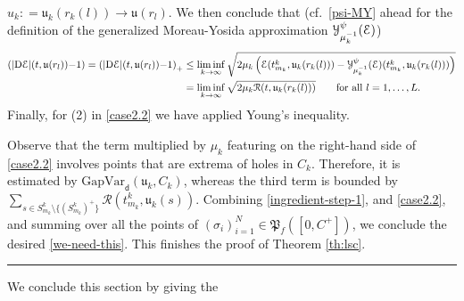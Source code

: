\documentclass[a4paper,10pt,reqno]{amsart} %
\numberwithin{equation}{section}
\newcommand{\QED}{\mbox{}\hfill\rule{5pt}{5pt}\medskip\par}
\def\calY{{\mathcal Y}} \def\calZ{{\mathcal Z}}
\def\rmD{{\mathrm D}} \def\rmE{{\mathrm E}} \def\rmF{{\mathrm F}}
\newcommand{\mdn}{\mathsf{d}}
\newcommand{\ene}[2]{\mathcal{E}(#1,#2)}
\newcommand{\rstab}[2]{\mathcal{R}(#1,#2)}
\newcommand{\slope}[3]{|\rmD {#1}|(#2,#3)}
\newcommand{\Gap}[3]{\mathrm{GapVar}_{#1}(#2,#3)}
\newcommand{\invcur}[1]{\mathfrak{u}_{#1}}
\newcommand{\invcu}{\mathfrak{u}}
\newcommand{\RRR}{\color{red}}
\newcommand{\EEE}{\color{black}}
\begin{document}
   $u_k: = \invcur k(r_k(l)) \to \invcu (r_l)$. 
   We then conclude that   (cf.\ \eqref{psi-MY} ahead for the definition of the generalized Moreau-Yosida approximation $\calY_{\mu_k^{-1}}^\psi (\calE)$) 
\begin{equation}
\label{partition-magic-2}
\begin{aligned}
\left(\slope \calE t{\invcu(r_l)}{-} 1 \right)=
 \left( \slope \calE t{\invcu(r_l)}{-}1 \right)_+
& \leq \liminf_{k\to\infty}\sqrt{2 \mu_k \left( \ene {t_{m_k}^k}{\invcur k (r_k(l))} -  \calY_{\mu_k^{-1}}^\psi (\calE)(t_{m_k}^k,\invcur k(r_k(l))) \right) }
\\&
= \liminf_{k\to\infty} \sqrt{2\mu_k \rstab t{\invcur k(r_k(l))}} \quad  \quad   \text{for all } l =1,\ldots, L. 
\end{aligned}
\end{equation}
Finally, for  {\footnotesize (2)} in  \eqref{case2.2} we have applied  
Young's inequality. %
\par
Observe that the term multiplied by $\mu_k$ featuring on the right-hand side of \eqref{case2.2} involves points that are extrema of holes in $C_k$. Therefore, it is estimated by $\Gap{\mdn}{\invcur k} {C_k} $,
whereas the third term is bounded by $\sum_{s\in S_{{m}_k}^k\setminus \{(S_{{m}_k}^k)^+\}} \rstab {t_{m_k}^k}{\invcur k(s)}$.
 Combining \eqref{ingredient-step-1},  
and \eqref{case2.2}, and summing over all the points of $(\sigma_i)_{i=1}^N \in \mathfrak{P}_f([0,C^+])$, we conclude the desired \eqref{we-need-this}. This finishes the proof  of Theorem \ref{th:lsc}. 
\QED
We conclude this section by giving the
\end{document}
